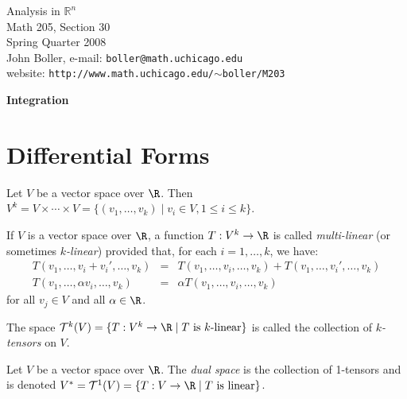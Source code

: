 \documentclass{book}
\begin{document}
\begin{center}
\Large
Analysis in ${\mathbb R}^n$ \\
Math 205, Section 30 \\
Spring Quarter 2008 \\
John Boller, e-mail:  {\tt boller@math.uchicago.edu} \\
website:  {\tt http://www.math.uchicago.edu/$\sim$boller/M203} \\
\end{center}


\vspace{50pt}
\LARGE
\begin{center}
{\bf Integration}
\end{center}

\vspace{30pt}
\normalsize

\section{Differential Forms}

\begin{definition}
Let $V$ be a vector space over $\R$.  Then $V^k=V\times\cdots \times V=\{(v_1, \ldots, v_k)\mid
v_i\in V, 1\leq i\leq k\}$.
\end{definition}

\begin{definition}
If $V$ is a vector space over $\R$, a function $T:V^k\to\R$ is called {\em multi-linear} (or sometimes
{\em $k$-linear}) provided that, for each $i=1,\ldots, k$, we have:
\begin{eqnarray*}
T(v_1, \ldots, v_i+v_i', \ldots, v_k) &=& T(v_1, \ldots, v_i,\ldots, v_k)+T(v_1, \ldots, v_i',\ldots, v_k) \\
T(v_1, \ldots, \alpha v_i, \ldots, v_k) &=& \alpha T(v_1, \ldots, v_i,\ldots, v_k) 
\end{eqnarray*}
for all $v_j\in V$ and all $\alpha\in\R$.
\end{definition}

\begin{definition}
The space $\mathcal{T}^k(V)=\{T:V^k\to\R\mid \mbox{$T$ is $k$-linear}\}$ is called the collection of
{\em $k$-tensors} on $V$.
\end{definition}

\begin{definition}
Let $V$ be a vector space over $\R$.  The {\em dual space} is 
the collection of 1-tensors and is denoted $V^*=\mathcal{T}^1(V)=\{T:V\to\R\mid \mbox{$T$ is linear}\}$.
\end{definition}
\end{document}
